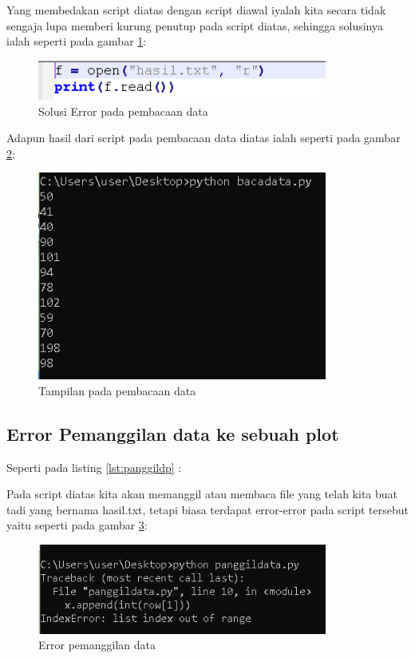 \begin{enumerate}
Yang membedakan script diatas dengan script diawal iyalah kita secara tidak sengaja lupa memberi kurung penutup pada script diatas, sehingga solusinya ialah seperti pada gambar \ref{fig:solerrdata}:
\begin{figure}[!htbp]
	\centerline{\includegraphics[width=0.85\textwidth]{figures/6/solerrdata.PNG}}
	\caption{Solusi Error pada pembacaan data}
	\label{fig:solerrdata}
\end{figure} 

Adapun hasil dari script pada pembacaan data diatas ialah seperti pada gambar \ref{fig:showdata}:
\begin{figure}[!htbp]
	\centerline{\includegraphics[width=0.85\textwidth]{figures/6/showdata.PNG}}
	\caption{Tampilan pada pembacaan data}
	\label{fig:showdata}
\end{figure} 
\end{enumerate}

\subsection{Error Pemanggilan data ke sebuah plot}
Seperti pada listing \ref{lst:panggildp} : 


Pada script diatas kita akan memanggil atau membaca file yang telah kita buat tadi yang bernama hasil.txt, tetapi biasa terdapat error-error pada script tersebut yaitu seperti pada gambar \ref{fig:errpd}:
\begin{figure}[!htbp]
	\centerline{\includegraphics[width=0.85\textwidth]{figures/6/errpd.PNG}}
	\caption{Error pemanggilan data}
	\label{fig:errpd}
\end{figure} 

